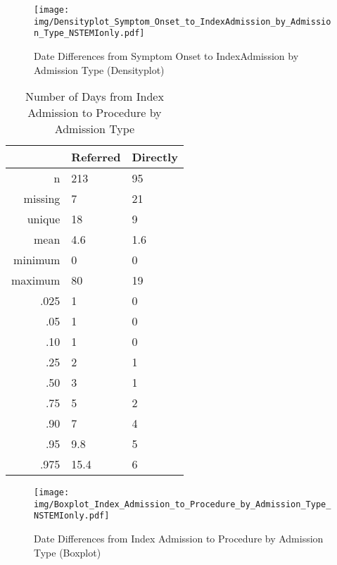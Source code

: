 \documentclass[presentation,xcolor=pdftex,dvipsnames,table,11pt]{beamer}
\begin{document}
\begin{tiny}
\begin{frame}
\begin{figure}
  \centering
  \caption{Date Differences from Symptom Onset to IndexAdmission by Admission Type (Densityplot)}
  \label{Density: Date Differences from Symptom Onset to IndexAdmission by Admission Type}
\texttt{[image: img/Densityplot\_Symptom\_Onset\_to\_IndexAdmission\_by\_Admission\_Type\_NSTEMIonly.pdf]}\end{figure}
\end{frame}




\begin{table}[ht]
\centering
\begin{tabular}{rll}
  \toprule
 & Referred & Directly \\ 
  \midrule
n & 213 & 95 \\ 
  missing & 7 & 21 \\ 
  unique & 18 & 9 \\ 
  mean & 4.6 & 1.6 \\ 
  minimum & 0 & 0 \\ 
  maximum & 80 & 19 \\ 
  .025 & 1 & 0 \\ 
  .05 & 1 & 0 \\ 
  .10 & 1 & 0 \\ 
  .25 & 2 & 1 \\ 
  .50 & 3 & 1 \\ 
  .75 & 5 & 2 \\ 
  .90 & 7 & 4 \\ 
  .95 & 9.8 & 5 \\ 
  .975 & 15.4 & 6 \\ 
   \bottomrule
\end{tabular}
\caption{Number of Days from Index Admission to Procedure by Admission Type} 
\end{table}
\begin{frame}
\begin{figure}
  \centering
  \caption{Date Differences from Index Admission to Procedure by Admission Type (Boxplot)}
  \label{Boxplot: Date Differences from Index Admission to Procedure by Admission Type}
\texttt{[image: img/Boxplot\_Index\_Admission\_to\_Procedure\_by\_Admission\_Type\_NSTEMIonly.pdf]}\end{figure}
\end{frame}



\end{tiny}
\end{document}
